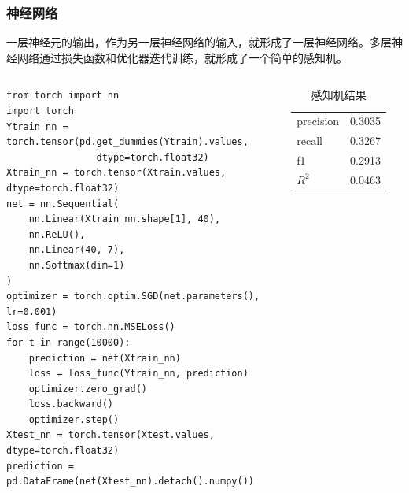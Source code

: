 \begin{frame}[fragile]
    \frametitle{神经网络}
    一层神经元的输出，作为另一层神经网络的输入，就形成了一层神经网络。多层神经网络通过损失函数和优化器迭代训练，就形成了一个简单的感知机。

    \begin{columns}
        \tiny
        \begin{verbatim}
from torch import nn
import torch
Ytrain_nn = torch.tensor(pd.get_dummies(Ytrain).values,
                dtype=torch.float32)
Xtrain_nn = torch.tensor(Xtrain.values, dtype=torch.float32)
net = nn.Sequential(
    nn.Linear(Xtrain_nn.shape[1], 40),
    nn.ReLU(),
    nn.Linear(40, 7),
    nn.Softmax(dim=1)
)
optimizer = torch.optim.SGD(net.parameters(), lr=0.001)
loss_func = torch.nn.MSELoss()
for t in range(10000):
    prediction = net(Xtrain_nn)
    loss = loss_func(Ytrain_nn, prediction)
    optimizer.zero_grad()
    loss.backward()
    optimizer.step()
Xtest_nn = torch.tensor(Xtest.values, dtype=torch.float32)
prediction = pd.DataFrame(net(Xtest_nn).detach().numpy())
        \end{verbatim}
        \begin{table}
            \caption{感知机结果}
            \begin{tabular}{ll}
                precision & 0.3035 \\
                recall    & 0.3267 \\
                f1        & 0.2913 \\
                \(R^2\)   & 0.0463 \\
            \end{tabular}
            \label{BP}
        \end{table}
    \end{columns}
\end{frame}
